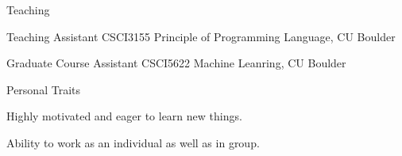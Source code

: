 \documentclass{resume} %
\begin{document}
\begin{rSection}{Teaching}

\begin{rSubsection}{}{}{}{}
\item \normalfont Teaching Assistant CSCI3155 Principle of Programming Language, CU Boulder
\item \normalfont Graduate Course Assistant CSCI5622 Machine Leanring, CU Boulder
\end{rSubsection}

\end{rSection}






\begin{rSection}{Personal Traits}

\begin{rSubsection}{}{}{}{}
\item Highly motivated and eager to learn new things.
\item Ability to work as an individual as well as in group.
\end{rSubsection}

\end{rSection}
\end{document}
